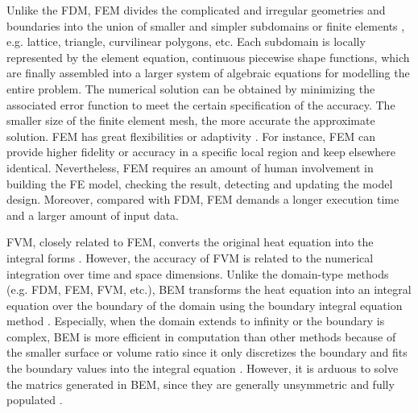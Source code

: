 Unlike the FDM, FEM \cite{zlamal1968finite} divides the complicated
and irregular geometries and boundaries into the union of smaller and
simpler subdomains or finite elements \cite{logan2011first},
e.g. lattice, triangle, curvilinear polygons, etc. Each subdomain is
locally represented by the element equation, continuous piecewise
shape functions, which are finally assembled into a larger system of
algebraic equations for modelling the entire problem. The numerical
solution can be obtained by minimizing the associated error function
to meet the certain specification of the accuracy. The smaller size of
the finite element mesh, the more accurate the approximate
solution. FEM has great flexibilities or
adaptivity \cite{reddy1993introduction}. For instance, FEM can provide
higher fidelity or accuracy in a specific local region and keep
elsewhere identical. Nevertheless, FEM requires an amount of human
involvement in building the FE model, checking the result, detecting
and updating the model design. Moreover, compared with FDM, FEM
demands a longer execution time and a larger amount of input data.


FVM, closely related to FEM, converts the original heat equation into
the integral forms \cite{eymard2000finite}. However, the accuracy of
FVM is related to the numerical integration over time and space
dimensions. Unlike the domain-type methods (e.g. FDM, FEM, FVM, etc.),
BEM transforms the heat equation into an integral equation over the
boundary of the domain using the boundary integral equation
method \cite{attaway1991boundary}. Especially, when the domain extends
to infinity or the boundary is complex, BEM is more efficient in
computation than other methods because of the smaller surface or
volume ratio \cite{katsikadelis2002boundary} since it only discretizes
the boundary and fits the boundary values into the integral
equation \cite{ang2007beginner}. However, it is arduous to solve the
matrics generated in BEM, since they are generally unsymmetric and
fully populated \cite{mushtaq2010advantages}.


